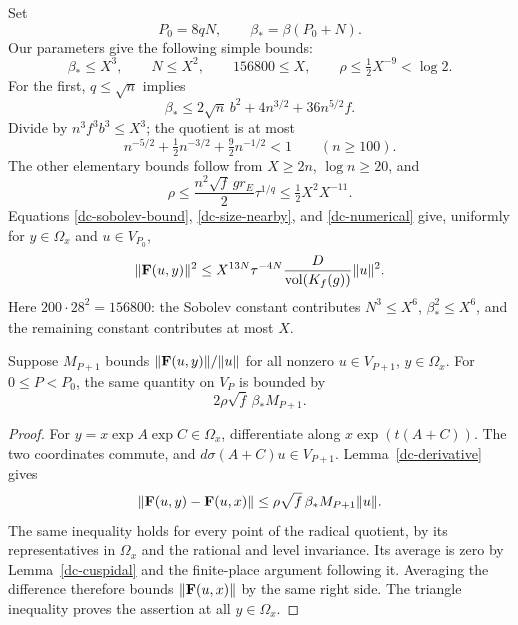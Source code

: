 Set
\[
 P_0=8qN,\qquad \beta_*=\beta(P_0+N).
\]
Our parameters give the following simple bounds:
\begin{equation}\label{dc-numerical}
 \beta_*\le X^3,\qquad N\le X^2,\qquad
 156800\le X,\qquad
 \rho\le\tfrac12X^{-9}<\log2.
\end{equation}
For the first, \(q\le\sqrt n\) implies
\[
 \beta_*\le2\sqrt n\,b^2+4n^{3/2}+36n^{5/2}f.
\]
Divide by \(n^3f^3b^3\le X^3\); the quotient is at most
\[
        n^{-5/2}+\tfrac12n^{-3/2}+\tfrac92n^{-1/2}<1
                         \qquad(n\ge100).
\]
The other elementary bounds follow from \(X\ge2n\),
\(\log n\ge20\), and
\[
 \rho\le\frac{n^2\sqrt f\,gr_E}{2}\tau^{1/q}
                          \le\tfrac12X^2X^{-11}.
\]
Equations \eqref{dc-sobolev-bound},
\eqref{dc-size-nearby}, and \eqref{dc-numerical}
give, uniformly for \(y\in\Omega_x\) and \(u\in V_{P_0}\),
\begin{equation}\label{dc-initial-evaluation}
 \|{\bf F}(u,y)\|^2
   \le X^{13N}\tau^{-4N}
       \frac{D}{\operatorname{vol}(K_f(g))}\|u\|^2.
\end{equation}
Here \(200\cdot28^2=156800\):
the Sobolev constant contributes \(N^3\le X^6\),
\(\beta_*^2\le X^6\), and the remaining constant
contributes at most \(X\).

\begin{lemma}\label{dc-iteration}
Suppose \(M_{P+1}\) bounds
\(\|{\bf F}(u,y)\|/\|u\|\) for all nonzero
\(u\in V_{P+1}\), \(y\in\Omega_x\).
For \(0\le P<P_0\), the same quantity on \(V_P\)
is bounded by
\[
                   2\rho\sqrt f\,\beta_* M_{P+1}.
\]
\end{lemma}
\begin{proof}
For \(y=x\exp A\exp C\in\Omega_x\), differentiate
along \(x\exp(t(A+C))\).  The two coordinates commute,
and \(d\sigma(A+C)u\in V_{P+1}\).
Lemma~\ref{dc-derivative} gives
\[
 \|{\bf F}(u,y)-{\bf F}(u,x)\|
                  \le\rho\sqrt f\,\beta_*M_{P+1}\|u\|.
\]
The same inequality holds for every point of the
radical quotient, by its representatives in
\(\Omega_x\) and the rational and level invariance.
Its average is zero by Lemma~\ref{dc-cuspidal} and
the finite-place argument following it.
Averaging the difference therefore bounds
\(\|{\bf F}(u,x)\|\) by the same right side.
The triangle inequality proves the assertion at
all \(y\in\Omega_x\).
\end{proof}

